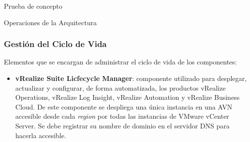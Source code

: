 \begin{section}{Prueba de concepto}
\begin{subsection}{Operaciones de la Arquitectura\cite{CFopermanagement}}
    \subsubsection{Gestión del Ciclo de Vida}
    Elementos que se encargan de administrar el ciclo de vida de los componentes:
    \begin{itemize}
        
        \item \textbf{vRealize Suite Licfecycle Manager}: componente utilizado para desplegar, actualizar y configurar, de forma automatizada, los productos vRealize Operations, vRealize Log Insight, vRealize Automation y vRealize Business Cloud. De este componente se despliega una única instancia en una AVN accesible desde cada \textit{region} por todas las instancias de VMware vCenter Server. Se debe registrar su nombre de dominio en el servidor DNS para hacerla accesible.
        

\end{itemize}
\end{subsection}
\end{section}
